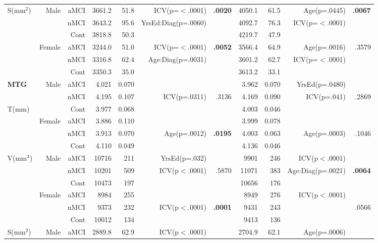 \documentclass[12pt]{article}
\newcommand\T{\rule{0pt}{2.6ex}}
\begin{document}
\begin{sidewaystable}
\begin{tabular}{l|rr|rrrr|rrrr}
	\hline
	\multirow{6}{*}{S(mm$^2$)} \T & \multirow{3}{*}{Male} & aMCI\T &3661.2 &51.8 & ICV(p=$<$.0001) & \textbf{.0020}&4050.1	 &61.5  & Age(p=.0445) & \textbf{.0067}  \\
							&							& nMCI & 3643.2	& 95.6	& YrsEd:Diag(p=.0060) & &4092.7 & 76.3 & ICV(p=$<$.0001) & \\
							&						& Cont & 3818.8	&50.3	& 		&  & 4219.7	& 47.9& & \\\cline{2-11}
							&	\multirow{3}{*}{Female}	& aMCI\T & 3244.0	&51.0	 & ICV(p=$<$.0001) & \textbf{.0052} & 3566.4	&64.9 & Age(p=.0016)& .3579 \\
							&						& nMCI & 3316.8	&62.4 & Age:Diag(p=.0031) & &3601.2	 & 62.7	 & ICV(p=$<$.0001) 		& \\
							&						& Cont & 3350.3& 35.0& 		& & 3613.2	& 33.1	& 		& \\
	\hline \hline
	\textbf{MTG} & \multirow{3}{*}{Male} & aMCI\T & 4.021 & 0.070 & & & 3.962 & 0.070 & YrsEd(p=.0480) & \\
							&						& nMCI & 4.195 & 0.107 & ICV(p=.0311)& .3136 & 4.169 & 0.090 & ICV(p=.041) & .2869 \\
	\multirow{2}{*}{T(mm)}						&						& Cont & 3.977 & 0.068 & & & 4.003 & 0.046 & &\\\cline{2-11}
							&	\multirow{3}{*}{Female}	& aMCI\T & 3.886 & 0.110 &  & & 3.999 & 0.078 & & \\
							&						& nMCI & 3.913 & 0.070 & Age(p=.0012)& \textbf{.0195} & 4.003 & 0.063 & Age(p=.0003) & .1046 \\
							&						& Cont & 4.110 & 0.049 & & & 4.136 & 0.046 & & \\
	\hline
	\multirow{6}{*}{V(mm$^3$)} & \multirow{3}{*}{Male} & aMCI\T & 10716 & 211 & YrsEd(p=.032)&  & 9901 & 246 & ICV(p$<$.0001) &  \\
							&						& nMCI & 10201 & 509 & ICV(p$<$.0001) & .5870 & 11071 & 383 & Age:Diag(p=.0021) & \textbf{.0064} \\
							&						& Cont & 10473 & 197 & & & 10656 & 176 & & \\\cline{2-11}
							&	\multirow{3}{*}{Female}	& aMCI\T & 8984 & 255 &  &   & 8949 & 276 & ICV(p$<$.0001)&  \\
							&						& nMCI & 9373 & 232 & ICV(p$<$.0001) & \textbf{.0001} & 9431 & 243 & & .0566\\
							&						& Cont & 10012 & 134 & & & 9413 & 136 & & \\
	\hline
	\multirow{6}{*}{S(mm$^2$)} & \multirow{3}{*}{Male} & aMCI\T & 2889.8 & 62.9 & ICV(p$<$.0001) &  & 2704.9 & 62.1 & Age(p=.0006) &\\

\end{tabular}
\end{sidewaystable}
\end{document}
